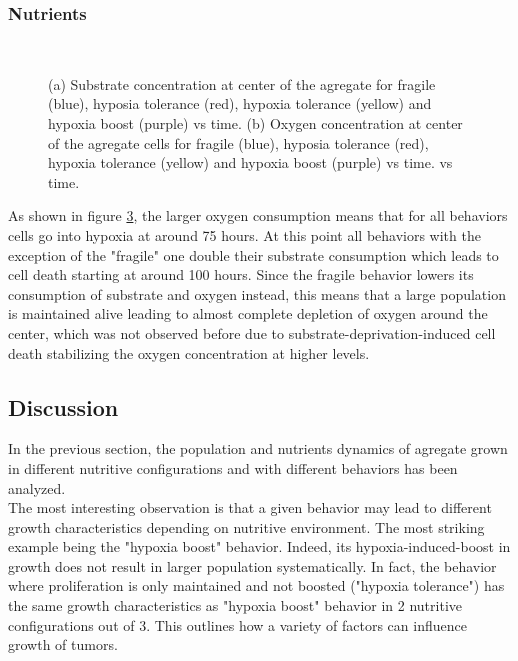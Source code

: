 \documentclass[11pt,a4paper]{article}
\begin{document}
\subsubsection{Nutrients}
\begin{figure}[h]
\begin{subfigure}{0.5\textwidth}
	\centering
	
	\caption{ \label{OS_S_Ox}}
\end{subfigure}
~~
\begin{subfigure}{0.5\textwidth}
	\centering
	
	\caption{\label{OS_O_Ox}}
\end{subfigure}
\caption{(a) Substrate concentration at center of the agregate for fragile (blue), hyposia tolerance (red), hypoxia tolerance (yellow) and hypoxia boost (purple) vs time. (b) Oxygen concentration at center of the agregate cells for fragile (blue), hyposia tolerance (red), hypoxia tolerance (yellow) and hypoxia boost (purple) vs time. vs time. \label{OS_nutrients_Ox}}
\end{figure}

As shown in figure \ref{OS_nutrients_Ox}, the larger oxygen consumption means that for all behaviors cells go into hypoxia at around 75 hours. At this point all behaviors with the exception of the "fragile" one double their substrate consumption which leads to cell death starting at around 100 hours. Since the fragile behavior lowers its consumption of substrate and oxygen instead, this means that a large population is maintained alive leading to almost complete depletion of oxygen around the center, which was not observed before due to substrate-deprivation-induced cell death stabilizing the oxygen concentration at higher levels.

\subsection{Discussion}
In the previous section, the population and nutrients dynamics of agregate grown in different nutritive configurations and with different behaviors has been analyzed.\\

The most interesting observation is that a given behavior may lead to different growth characteristics depending on nutritive environment. The most striking example being the "hypoxia boost" behavior. Indeed, its hypoxia-induced-boost in growth does not result in larger population systematically. In fact, the behavior where proliferation is only maintained and not boosted ("hypoxia tolerance") has the same growth characteristics as "hypoxia boost" behavior in 2 nutritive configurations out of 3. This outlines how a variety of factors can influence growth of tumors.\\
\end{document}
